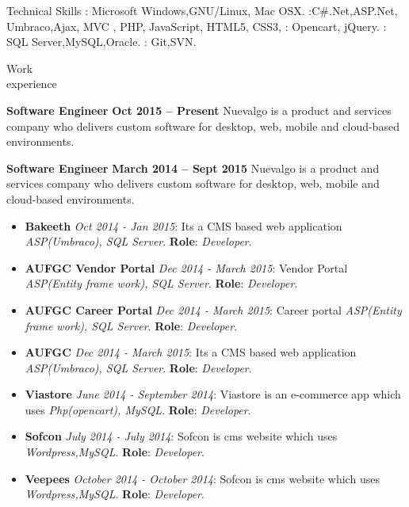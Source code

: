 \documentclass{resume}
\author{Babin Babu}
\begin{document}
\maketitle


\begin{category}{Technical Skills}
  :  Microsoft Windows,GNU/Linux, Mac OSX.
  :C#.Net,ASP.Net, Umbraco,Ajax, MVC , PHP, JavaScript, HTML5, CSS3,
  : Opencart, jQuery.
  : SQL Server,MySQL,Oracle.
  : Git,SVN.
\end{category}


\begin{category}{Work \\experience}

  \citemnobullet \textbf{Software Engineer} \hfill \textbf{Oct 2015 -- Present }
  \citemnobullet Nuevalgo is a product and services company who delivers custom software for desktop, web, mobile and cloud-based environments.

  \citemnobullet \textbf{Software Engineer} \hfill \textbf{March 2014 -- Sept 2015}
  \citemnobullet Nuevalgo is a product and services company who delivers custom software for desktop, web, mobile and cloud-based environments.
  \begin{itemize}
  \item \textbf{Bakeeth} {\em Oct 2014 - Jan 2015}: Its a CMS based web application {\em ASP(Umbraco),  SQL Server}. \textbf{Role}: {\em Developer}.  
  \item \textbf{AUFGC Vendor Portal} {\em Dec 2014 - March 2015}: Vendor Portal {\em ASP(Entity frame work),  SQL Server}. \textbf{Role}: {\em Developer}.  
  \item \textbf{AUFGC Career Portal} {\em Dec 2014 - March 2015}: Career portal {\em ASP(Entity frame work),  SQL Server}. \textbf{Role}: {\em Developer}.  
  \item \textbf{AUFGC} {\em Dec 2014 - March 2015}: Its a CMS based web application {\em ASP(Umbraco),  SQL Server}. \textbf{Role}: {\em Developer}.  
  \item \textbf{Viastore} {\em June 2014 - September 2014}: Viastore is an e-commerce app which uses {\em Php(opencart),  MySQL}. \textbf{Role}: {\em Developer}.  
  \item \textbf{Sofcon} {\em July 2014 - July 2014}: Sofcon is cms website which uses {\em Wordpress,MySQL}. \textbf{Role}: {\em Developer}.
  \item \textbf{Veepees} {\em October 2014 - October 2014}: Sofcon is cms website which uses {\em Wordpress,MySQL}. \textbf{Role}: {\em Developer}.
  \end{itemize}
  \end{category}
\end{document}
